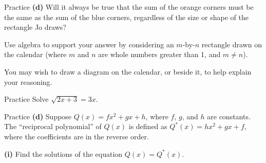\documentclass[aspectratio=169,11pt,xcolor=table,t]{beamer}
\begin{document}
\begin{frame}{Practice}
\relax
\textbf{(d)} Will it always be true that the sum of the orange corners must be the same as the sum of the blue corners, regardless of the size or shape of the rectangle Jo draws?\par\smallskip
Use algebra to support your answer by considering an $m$-by-$n$ rectangle drawn on the calendar (where $m$ and $n$ are whole numbers greater than 1, and $m \neq n$).\par\smallskip
You may wish to draw a diagram on the calendar, or beside it, to help explain your reasoning.
\end{frame}

\begin{frame}{Practice}
\relax
{} Solve $\sqrt{2x + 3} = 3x$.
\end{frame}

\begin{frame}{Practice}
\relax
\textbf{(d)} Suppose $Q(x) = fx^{2} + gx + h$, where $f$, $g$, and $h$ are constants. The ``reciprocal polynomial'' of $Q(x)$ is defined as $Q^{*}(x) = hx^{2} + gx + f$, where the coefficients are in the reverse order.\par\smallskip
\textbf{(i)} Find the solutions of the equation $Q(x) = Q^{*}(x)$.
\end{frame}
\end{document}
